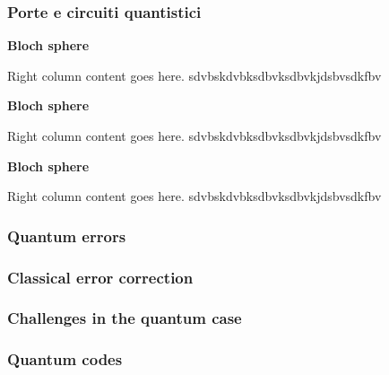 \documentclass{beamer}
\begin{document}
\begin{frame}
	\frametitle{Porte e circuiti quantistici}

	\begin{minipage}{0.31\textwidth}
		\begin{center}
			\textbf{Bloch sphere}
		\end{center}
		Right column content goes here.
		sdvbskdvbksdbvksdbvkjdsbvsdkfbv
	\end{minipage}	\begin{minipage}{0.31\textwidth}
		\begin{center}
			\textbf{Bloch sphere}
		\end{center}
		Right column content goes here.
		sdvbskdvbksdbvksdbvkjdsbvsdkfbv
	\end{minipage}	\begin{minipage}{0.31\textwidth}
		\begin{center}
			\textbf{Bloch sphere}
		\end{center}
		Right column content goes here.
		sdvbskdvbksdbvksdbvkjdsbvsdkfbv
	\end{minipage}
\end{frame}


\begin{frame}
	\frametitle{Quantum errors}
\end{frame}


\begin{frame}
	\frametitle{Classical error correction}
\end{frame}

\begin{frame}
	\frametitle{Challenges in the quantum case}
\end{frame}

\begin{frame}
	\frametitle{Quantum codes}
\end{frame}

\begin{frame}

\end{frame}
\end{document}
